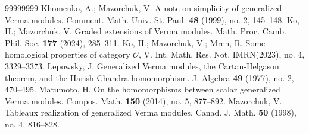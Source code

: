\documentclass[a4paper]{amsart}
\begin{document}
\begin{thebibliography}{99999999}
Khomenko, A.; Mazorchuk, V.
A note on simplicity of generalized Verma modules.
Comment. Math. Univ. St. Paul. {\bf 48} (1999), no. 2, 145--148.
 Ko, H.; Mazorchuk, V.
Graded extensions of Verma modules.
Math. Proc. Camb. Phil. Soc. {\bf 177} (2024), 285--311.
 Ko, H.; Mazorchuk, V.;  Mr{\dj}en, R.
Some homological properties of category $\mathcal{O}$, V.
Int. Math. Res. Not. IMRN(2023), no. 4, 3329--3373.
Lepowsky, J. 
Generalized Verma modules, the Cartan-Helgason theorem, and 
the Harish-Chandra homomorphism. 
J. Algebra {\bf 49} (1977), no. 2, 470--495.
% 
Matumoto, H. On the homomorphisms between scalar generalized 
Verma modules. Compos. Math. {\bf 150} (2014), no. 5, 877--892.
Mazorchuk, V.
Tableaux realization of generalized Verma modules.
Canad. J. Math. {\bf 50} (1998), no. 4, 816--828.

\end{thebibliography}
\end{document}
